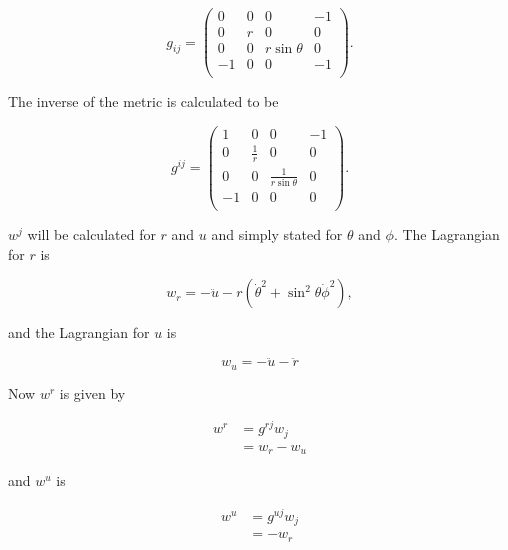 \begin{equation*}
g_{ij} = 
\left(
\begin{array}{cccc}
0  & 0 & 0             & -1 \\
0  & r & 0             & 0  \\
0  & 0 & r\sin{\theta} & 0  \\
-1 & 0 & 0             & -1 \\
\end{array}
\right).
\end{equation*}

\noindent The inverse of the metric is calculated to be

\begin{equation*}
g^{ij} =
\left(
\begin{array}{cccc}
1  & 0           & 0                       & -1 \\
0  & \frac{1}{r} & 0                       & 0  \\
0  & 0           & \frac{1}{r\sin{\theta}} & 0  \\
-1 & 0           & 0                       & 0  \\
\end{array}
\right).
\end{equation*}

\noindent $w^{j}$ will be calculated for $r$ and $u$ and simply stated for $\theta$ and $\phi$. The Lagrangian for $r$ is

\begin{equation*}
w_{r} = - \ddot{u} - r (\dot{\theta}^2 + \sin^2{\theta}\dot{\phi}^2),
\end{equation*}

\noindent and the Lagrangian for $u$ is

\begin{equation*}
w_{u} = - \ddot{u} - \ddot{r}  
\end{equation*}
 
\noindent Now $w^{r}$ is given by

\begin{align*}
w^{r} & = g^{rj} w_{j} \\
      & = w_{r} - w_{u}
\end{align*}

\noindent and $w^{u}$ is

\begin{align*}
w^{u} & = g^{uj} w_{j} \\
      & =  - w_{r}
\end{align*}

